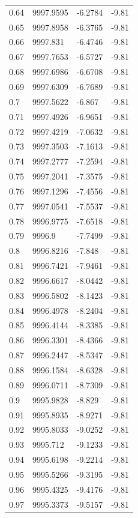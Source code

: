 \begin{table}[H]
\begin{tabular}{llll}
0.64 & 9997.9595 & -6.2784 & -9.81 \\
0.65 & 9997.8958 & -6.3765 & -9.81 \\
0.66 & 9997.831 & -6.4746 & -9.81 \\
0.67 & 9997.7653 & -6.5727 & -9.81 \\
0.68 & 9997.6986 & -6.6708 & -9.81 \\
0.69 & 9997.6309 & -6.7689 & -9.81 \\
0.7 & 9997.5622 & -6.867 & -9.81 \\
0.71 & 9997.4926 & -6.9651 & -9.81 \\
0.72 & 9997.4219 & -7.0632 & -9.81 \\
0.73 & 9997.3503 & -7.1613 & -9.81 \\
0.74 & 9997.2777 & -7.2594 & -9.81 \\
0.75 & 9997.2041 & -7.3575 & -9.81 \\
0.76 & 9997.1296 & -7.4556 & -9.81 \\
0.77 & 9997.0541 & -7.5537 & -9.81 \\
0.78 & 9996.9775 & -7.6518 & -9.81 \\
0.79 & 9996.9 & -7.7499 & -9.81 \\
0.8 & 9996.8216 & -7.848 & -9.81 \\
0.81 & 9996.7421 & -7.9461 & -9.81 \\
0.82 & 9996.6617 & -8.0442 & -9.81 \\
0.83 & 9996.5802 & -8.1423 & -9.81 \\
0.84 & 9996.4978 & -8.2404 & -9.81 \\
0.85 & 9996.4144 & -8.3385 & -9.81 \\
0.86 & 9996.3301 & -8.4366 & -9.81 \\
0.87 & 9996.2447 & -8.5347 & -9.81 \\
0.88 & 9996.1584 & -8.6328 & -9.81 \\
0.89 & 9996.0711 & -8.7309 & -9.81 \\
0.9 & 9995.9828 & -8.829 & -9.81 \\
0.91 & 9995.8935 & -8.9271 & -9.81 \\
0.92 & 9995.8033 & -9.0252 & -9.81 \\
0.93 & 9995.712 & -9.1233 & -9.81 \\
0.94 & 9995.6198 & -9.2214 & -9.81 \\
0.95 & 9995.5266 & -9.3195 & -9.81 \\
0.96 & 9995.4325 & -9.4176 & -9.81 \\
0.97 & 9995.3373 & -9.5157 & -9.81 \\

\end{tabular}
\end{table}
